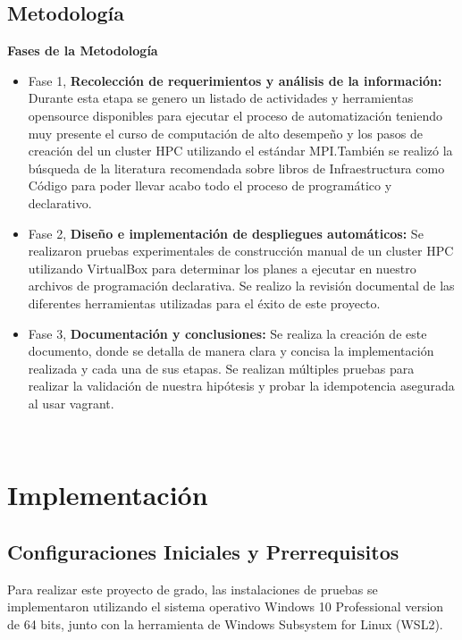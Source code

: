 \documentclass[letterpaper, 12pt, oneside]{article}
\begin{document}
    \subsection{Metodología}
    \textbf{Fases de la Metodología}
    \begin{itemize}
        \item Fase 1, \textbf{Recolección de requerimientos y análisis de la información:} Durante esta etapa se genero un listado de actividades y herramientas opensource disponibles para ejecutar el proceso de automatización teniendo muy presente el curso de computación de alto desempeño y los pasos de creación del un cluster HPC utilizando el estándar MPI.También se realizó la búsqueda de la literatura recomendada sobre libros de Infraestructura como Código para poder llevar acabo todo el proceso de programático y declarativo. 
        \item Fase 2, \textbf{ Diseño e implementación de despliegues automáticos:} Se realizaron pruebas experimentales de construcción manual de un cluster HPC utilizando VirtualBox para determinar los planes a ejecutar en nuestro archivos de programación declarativa. Se realizo la revisión documental de las diferentes herramientas utilizadas para el éxito de este proyecto. 
        
        \item Fase 3, \textbf{Documentación y conclusiones:} Se realiza la creación de este documento, donde se detalla de manera clara y concisa la implementación realizada y cada una de sus etapas. Se realizan múltiples pruebas para realizar la validación de nuestra hipótesis y probar la idempotencia asegurada al usar vagrant.
        
    \end{itemize}\\
       \clearpage
    
    \section{Implementación}\label{implementacion}
    \subsection{Configuraciones Iniciales y Prerrequisitos}
    Para realizar este proyecto de grado, las instalaciones de pruebas se implementaron utilizando el sistema operativo Windows 10 Professional version de 64 bits, junto con la herramienta de Windows Subsystem for Linux (WSL2).
    
\end{document}
